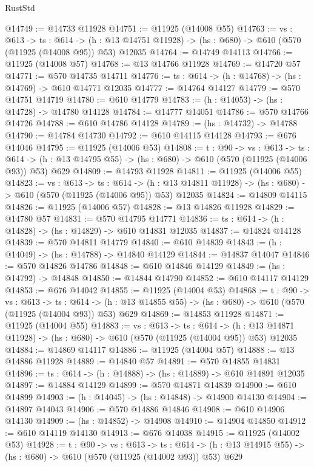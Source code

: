 \begin{lexlean}{RustStd}
\begin{coremodule}
@14749 := @14733 @11928
@14751 := @11925 (@14008 @55)
@14763 := {vs : @613} ->
  {ts : @614} ->
  (h : @13 @14751 @11928) -> (hs : @680) -> @610 (@570 (@11925 (@14008 @95)) @53) @12035
@14764 := @14749 @14113
@14766 := @11925 (@14008 @57)
@14768 := @13 @14766 @11928
@14769 := @14720 @57
@14771 := @570 @14735 @14711
@14776 := {ts : @614} -> (h : @14768) -> (hs : @14769) -> @610 @14771 @12035
@14777 := @14764 @14127
@14779 := @570 @14751 @14719
@14780 := @610 @14779
@14783 := (h : @14053) -> (hs : @14728) -> @14780 @14128
@14784 := @14777 @14051
@14786 := @570 @14766 @14726
@14788 := @610 @14786 @14128
@14789 := (hs : @14732) -> @14788
@14790 := @14784 @14730
@14792 := @610 @14115 @14128
@14793 := @676 @14046
@14795 := @11925 (@14006 @53)
@14808 := {t : @90} ->
  {vs : @613} ->
  {ts : @614} -> (h : @13 @14795 @55) -> (hs : @680) -> @610 (@570 (@11925 (@14006 @93)) @53) @629
@14809 := @14793 @11928
@14811 := @11925 (@14006 @55)
@14823 := {vs : @613} ->
  {ts : @614} ->
  (h : @13 @14811 @11928) -> (hs : @680) -> @610 (@570 (@11925 (@14006 @95)) @53) @12035
@14824 := @14809 @14115
@14826 := @11925 (@14006 @57)
@14828 := @13 @14826 @11928
@14829 := @14780 @57
@14831 := @570 @14795 @14771
@14836 := {ts : @614} -> (h : @14828) -> (hs : @14829) -> @610 @14831 @12035
@14837 := @14824 @14128
@14839 := @570 @14811 @14779
@14840 := @610 @14839
@14843 := (h : @14049) -> (hs : @14788) -> @14840 @14129
@14844 := @14837 @14047
@14846 := @570 @14826 @14786
@14848 := @610 @14846 @14129
@14849 := (hs : @14792) -> @14848
@14850 := @14844 @14790
@14852 := @610 @14117 @14129
@14853 := @676 @14042
@14855 := @11925 (@14004 @53)
@14868 := {t : @90} ->
  {vs : @613} ->
  {ts : @614} -> (h : @13 @14855 @55) -> (hs : @680) -> @610 (@570 (@11925 (@14004 @93)) @53) @629
@14869 := @14853 @11928
@14871 := @11925 (@14004 @55)
@14883 := {vs : @613} ->
  {ts : @614} ->
  (h : @13 @14871 @11928) -> (hs : @680) -> @610 (@570 (@11925 (@14004 @95)) @53) @12035
@14884 := @14869 @14117
@14886 := @11925 (@14004 @57)
@14888 := @13 @14886 @11928
@14889 := @14840 @57
@14891 := @570 @14855 @14831
@14896 := {ts : @614} -> (h : @14888) -> (hs : @14889) -> @610 @14891 @12035
@14897 := @14884 @14129
@14899 := @570 @14871 @14839
@14900 := @610 @14899
@14903 := (h : @14045) -> (hs : @14848) -> @14900 @14130
@14904 := @14897 @14043
@14906 := @570 @14886 @14846
@14908 := @610 @14906 @14130
@14909 := (hs : @14852) -> @14908
@14910 := @14904 @14850
@14912 := @610 @14119 @14130
@14913 := @676 @14038
@14915 := @11925 (@14002 @53)
@14928 := {t : @90} ->
  {vs : @613} ->
  {ts : @614} -> (h : @13 @14915 @55) -> (hs : @680) -> @610 (@570 (@11925 (@14002 @93)) @53) @629

\end{coremodule}
\end{lexlean}
